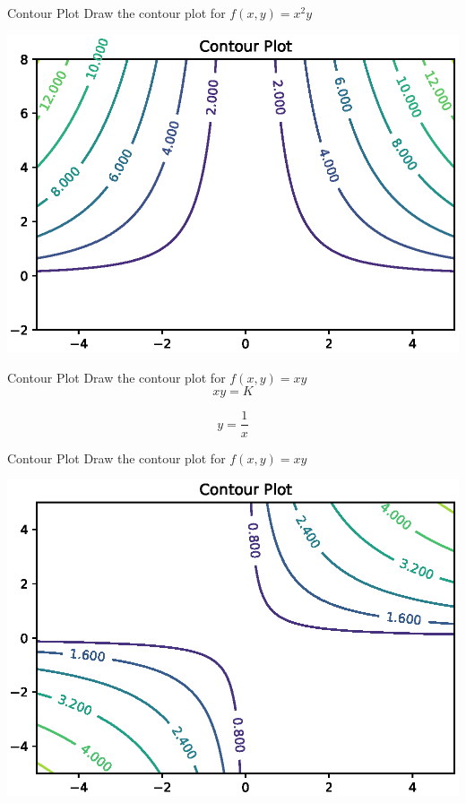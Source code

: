 \documentclass{beamer}
\begin{document}
\begin{frame}{Contour Plot}
    Draw the contour plot for $f(x,y) = x^{2}y$\\
    \begin{center}
     \includegraphics[totalheight=6cm]{ml-maths/contour-plot-4.eps}
 \end{center}
\end{frame}


\begin{frame}{Contour Plot}
    Draw the contour plot for $f(x,y) = xy$\\
    \begin{equation*}
        xy = K
    \end{equation*}
    
    \begin{equation*}
        y = \frac{1}{x}
    \end{equation*}
\end{frame}

\begin{frame}{Contour Plot}
    Draw the contour plot for $f(x,y) = xy$\\
        \begin{center}
     \includegraphics[totalheight=6cm]{ml-maths/contour-plot-5.eps}
 \end{center}
\end{frame}
\end{document}
